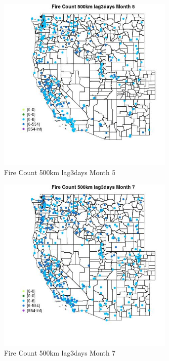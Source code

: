 \begin{figure} 
\centering  
\includegraphics[width=0.77\textwidth]{Code_Outputs/Report_ML_input_PM25_Step4_part_e_de_duplicated_aves_compiled_2019-05-18wNAs_MapObsMo5Fire_Count_500km_lag3days.jpg} 
\caption{\label{fig:Report_ML_input_PM25_Step4_part_e_de_duplicated_aves_compiled_2019-05-18wNAsMapObsMo5Fire_Count_500km_lag3days}Fire Count 500km lag3days Month 5} 
\end{figure} 
 

\begin{figure} 
\centering  
\includegraphics[width=0.77\textwidth]{Code_Outputs/Report_ML_input_PM25_Step4_part_e_de_duplicated_aves_compiled_2019-05-18wNAs_MapObsMo7Fire_Count_500km_lag3days.jpg} 
\caption{\label{fig:Report_ML_input_PM25_Step4_part_e_de_duplicated_aves_compiled_2019-05-18wNAsMapObsMo7Fire_Count_500km_lag3days}Fire Count 500km lag3days Month 7} 
\end{figure} 
 

